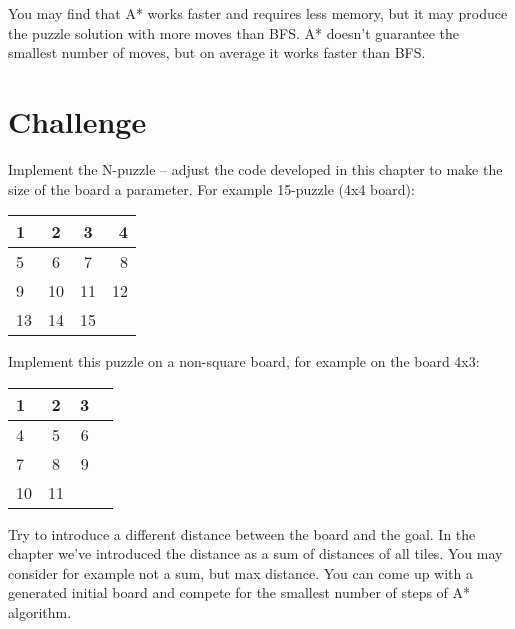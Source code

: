You may find that A* works faster and requires less memory,
but it may produce the puzzle solution with more moves
than BFS. A* doesn't guarantee the smallest number of moves,
but on average it works faster than BFS.

\section{Challenge}

Implement the N-puzzle -- adjust the code developed in this
chapter to make the size of the board a parameter. For example
15-puzzle (4x4 board):

\begin{center}
\begin{tabular}{ | l | c | c | r | }
    \hline
    1 & 2 & 3 & 4 \\ \hline
    5 & 6 & 7 & 8 \\ \hline
    9 & 10 & 11 & 12 \\ \hline
    13 & 14 & 15 & \\
    \hline
  \end{tabular}
\end{center}

Implement this puzzle on a non-square board, for example on the board
4x3:

\begin{center}
\begin{tabular}{ | l | c | c | r | }
    \hline
    1 & 2 & 3 \\ \hline
    4 & 5 & 6 \\ \hline
    7 & 8 & 9 \\ \hline
    10 & 11 &  \\
    \hline
  \end{tabular}
\end{center}

Try to introduce a different distance between the board and the goal.
In the chapter we've introduced the distance as a sum of distances
of all tiles. You may consider for example not a sum, but max distance.
You can come up with a generated initial board and compete for the
smallest number of steps of A* algorithm.
